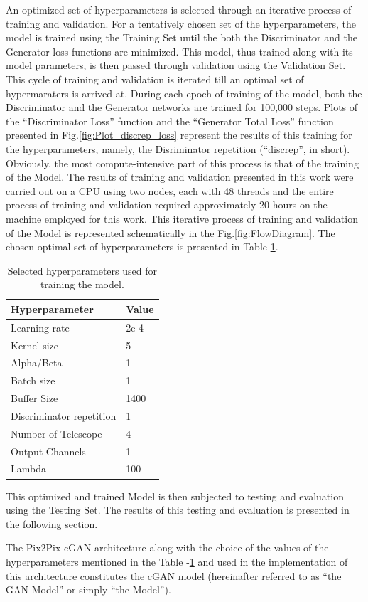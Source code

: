 An optimized set of hyperparameters is selected through an iterative process of training and validation. For a tentatively chosen set of the hyperparameters, the model is trained using the Training Set until the both the Discriminator and the Generator loss functions are minimized. This model, thus trained along with its model parameters, is then passed through validation using the Validation Set. This cycle of training and validation is iterated till an optimal set of hypermaraters is arrived at. During each epoch of training of the model, both the Discriminator and the Generator networks are trained for 100,000 steps. Plots of the ``Discriminator Loss'' function and the ``Generator Total Loss'' function presented in Fig.{\ref{fig:Plot_discrep_loss}} represent the results of this training for the hyperparameters, namely, the Disriminator repetition (``discrep'', in short). Obviously, the most compute-intensive part of this process is that of the training of the Model. The results of training and validation presented in this work were carried out on a CPU using two nodes, each with 48 threads and the entire process of training and validation required approximately 20 hours on the machine employed for this work. This iterative process of training and validation of the Model is represented schematically in the Fig.\ref{fig:FlowDiagram}. The chosen optimal set of hyperparameters is presented in Table-{\ref{tab:hyperparameters}.}
\begin{table}[ht]
	\centering
	\caption{Selected hyperparameters used for training the model.}
	\label{tab:hyperparameters}
	\begin{tabular}{ll}
		\hline
		\textbf{Hyperparameter} & \textbf{Value} \\
		\hline
		Learning rate           & 2e-4 \\
		Kernel size             & 5 \\
		Alpha/Beta              & 1 \\
		Batch size              & 1 \\
		Buffer Size             & 1400 \\
		Discriminator repetition  & 1 \\
		Number of Telescope        & 4 \\
		Output Channels         & 1 \\
		Lambda                  & 100 \\
		\hline
	\end{tabular}
\end{table}
This optimized and trained Model is then subjected to testing and evaluation using the Testing Set. The results of this testing and evaluation is presented in the following section.

The Pix2Pix cGAN architecture along with the choice of the values of the hyperparameters mentioned in the Table -\ref{tab:hyperparameters} and used in the implementation of this architecture constitutes the cGAN model (hereinafter referred to as ``the GAN Model'' or simply ``the Model'').
